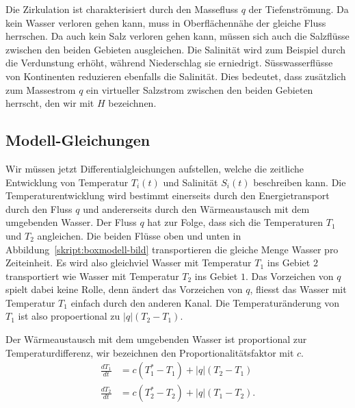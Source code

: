 Die Zirkulation ist charakterisiert durch den Massefluss $q$ der
Tiefenströmung.
Da kein Wasser verloren gehen kann, muss in Oberflächennähe der gleiche
Fluss herrschen.
Da auch kein Salz verloren gehen kann, müssen sich auch die Salzflüsse
zwischen den beiden Gebieten ausgleichen.
Die Salinität wird zum Beispiel durch die Verdunstung erhöht, während
Niederschlag sie erniedrigt.
Süsswasserflüsse von Kontinenten reduzieren ebenfalls die Salinität.
Dies bedeutet, dass zusätzlich zum Massestrom $q$ ein virtueller 
Salzstrom zwischen den beiden Gebieten herrscht, den wir mit $H$ bezeichnen.

\subsection{Modell-Gleichungen}
Wir müssen jetzt Differentialgleichungen aufstellen, welche die
zeitliche Entwicklung von Temperatur $T_i(t)$ und Salinität $S_i(t)$
beschreiben kann.
Die Temperaturentwicklung wird bestimmt einerseits durch den Energietransport
durch den Fluss $q$ und andererseits durch den Wärmeaustausch mit dem
umgebenden Wasser.
Der Fluss $q$ hat zur Folge, dass sich die Temperaturen $T_1$ und $T_2$
angleichen.
Die beiden Flüsse oben und unten in Abbildung~\ref{skript:boxmodell-bild}
transportieren die gleiche Menge Wasser pro Zeiteinheit.
Es wird also gleichviel Wasser mit Temperatur $T_1$ ins Gebiet $2$ 
transportiert wie Wasser mit Temperatur $T_2$ ins Gebiet $1$.
Das Vorzeichen von $q$ spielt dabei keine Rolle, denn ändert das
Vorzeichen von $q$, fliesst das Wasser mit Temperatur $T_1$ einfach
durch den anderen Kanal.
Die Temperaturänderung von $T_1$ ist also propoertional zu $|q|(T_2-T_1)$.

Der Wärmeaustausch mit dem umgebenden Wasser ist proportional zur
Temperaturdifferenz, wir bezeichnen den Proportionalitätsfaktor mit $c$.
\begin{equation}
\begin{aligned}
\frac{dT_1}{dt}
&=
c(T_1^*-T_1)
+
|q|(T_2-T_1)
\\
\frac{dT_2}{dt}
&=
c(T_2^*-T_2)
+
|q|(T_1-T_2).
\end{aligned}
\label{skript:thc:temperaturgleichung}
\end{equation}

